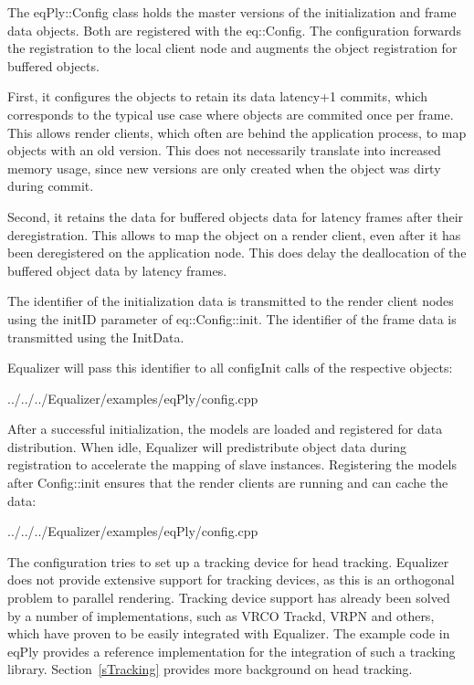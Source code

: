 \documentclass[10pt,a4]{scrartcl}
\newcommand{\sref}[1]{Section~\ref{#1}}
\begin{document}
The \textsf{eqPly::Config} class holds the master versions of the initialization
and frame data objects. Both are registered with the \textsf{eq::Config}. The
configuration forwards the registration to the local client node and augments
the object registration for buffered objects. 

First, it configures the objects to retain its data \textsf{latency+1} commits,
which corresponds to the typical use case where objects are commited once per
frame. This allows render clients, which often are behind the application
process, to map objects with an old version. This does not necessarily translate
into increased memory usage, since new versions are only created when the object
was dirty during commit.

Second, it retains the data for buffered objects data for \textsf{latency}
frames after their deregistration. This allows to map the object on a render
client, even after it has been deregistered on the application node. This does
delay the deallocation of the buffered object data by \textsf{latency} frames.

The identifier of the initialization data is transmitted to the render client
nodes using the \textsf{initID} parameter of \textsf{eq::Config::init}. The
identifier of the frame data is transmitted using the \textsf{InitData}.

Equalizer will pass this identifier to all \textsf{configInit} calls of
the respective objects:

{\footnotesize
  {../../../Equalizer/examples/eqPly/config.cpp}}

After a successful initialization, the models are loaded and registered for data
distribution. When idle, Equalizer will predistribute object data during
registration to accelerate the mapping of slave instances. Registering the
models after \textsf{Config::init} ensures that the render clients are running
and can cache the data:

{\footnotesize
  {../../../Equalizer/examples/eqPly/config.cpp}}

The configuration tries to set up a tracking device for head tracking. Equalizer
does not provide extensive support for tracking devices, as this is an
orthogonal problem to parallel rendering. Tracking device support has already
been solved by a number of implementations, such as VRCO Trackd, VRPN and
others, which have proven to be easily integrated with Equalizer. The example
code in \textsf{eqPly} provides a reference implementation for the integration
of such a tracking library. \sref{sTracking} provides more background on head
tracking.
\end{document}
